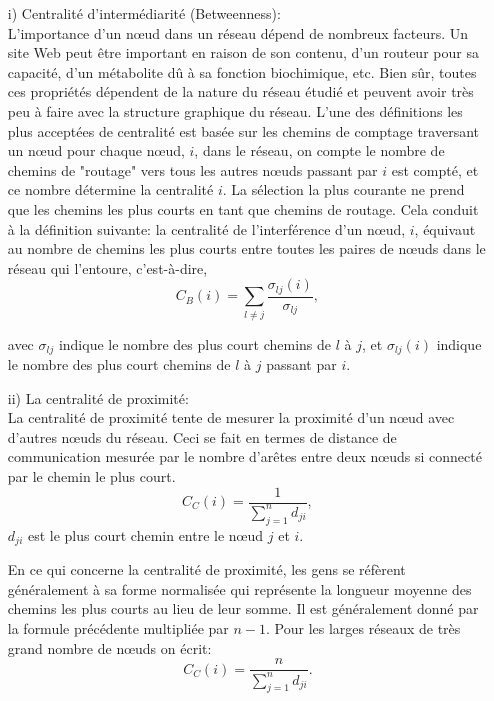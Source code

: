 \begin{itemize}
 \item[i)] Centralité d'intermédiarité (Betweenness):\\
  L'importance d'un nœud dans un réseau dépend de nombreux facteurs. Un site Web peut être important en raison de son contenu, d'un routeur pour sa capacité, d'un métabolite dû à sa fonction biochimique, etc. Bien sûr, toutes ces propriétés dépendent de la nature du réseau étudié et peuvent avoir très peu à faire avec la structure graphique du réseau. L'une des définitions les plus acceptées de centralité est basée sur les chemins de comptage traversant un nœud pour chaque nœud, $i$, dans le réseau, on compte le nombre de chemins de "routage" vers tous les autres nœuds passant par $i$ est compté, et ce nombre détermine la centralité $i$. La sélection la plus courante ne prend que les chemins les plus courts en tant que chemins de routage. Cela conduit à la définition suivante: la centralité de l'interférence d'un nœud, $i$, équivaut au nombre de chemins les plus courts entre toutes les paires de nœuds dans le réseau qui l'entoure, c'est-à-dire,
 \begin{equation}
 C_B(i)=\sum_{l\neq j}\dfrac{\sigma_{lj}(i)}{\sigma_{lj}},
 \end{equation}
 
 avec $\sigma_{lj}$ indique le nombre des plus court chemins de $l$ à $j$, et $\sigma_{lj}(i)$ indique le nombre des plus court chemins de $l$ à $j$ passant par $i$.
 
\item[ii)] La centralité de proximité:\\
La centralité de proximité tente de mesurer la proximité d'un nœud avec d'autres nœuds du réseau. Ceci se fait en termes de distance de communication mesurée par le nombre d'arêtes entre deux nœuds si connecté par le chemin le plus court.
\begin{equation}
C_C(i)=\dfrac{1}{\sum_{j=1}^nd_{ji}},
\end{equation}
$d_{ji}$ est le plus court chemin entre le nœud $j$ et $i$.

En ce qui concerne la centralité de proximité, les gens se réfèrent généralement à sa forme normalisée qui représente la longueur moyenne des chemins les plus courts au lieu de leur somme. Il est généralement donné par la formule précédente multipliée par $n-1$. Pour les larges réseaux de très grand nombre de nœuds on écrit:
\begin{equation}
C_C(i)=\dfrac{n}{\sum_{j=1}^nd_{ji}}.
\end{equation}
\end{itemize}

